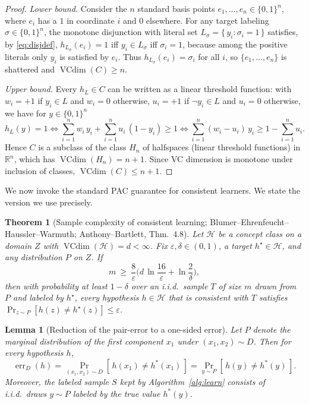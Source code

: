 \documentclass{amsart}
\newtheorem{theorem}{Theorem}
\newtheorem{lemma}{Lemma}
\theoremstyle{definition}
\theoremstyle{remark}
\newcommand{\R}{\mathbb{R}}
\newcommand{\eps}{\varepsilon}
\DeclareMathOperator{\VCdim}{VCdim}
\DeclareMathOperator*{\err}{err}
\begin{document}
\begin{proof}
\emph{Lower bound.} Consider the $n$ standard basis points $e_1,\dots,e_n\in
\{0,1\}^n$, where $e_i$ has a $1$ in coordinate $i$ and $0$ elsewhere. For any
target labeling $\sigma\in\{0,1\}^n$, the monotone disjunction with literal set
$L_\sigma=\{\,y_i:\sigma_i=1\,\}$ satisfies, by \eqref{eq:disjdef},
$h_{L_\sigma}(e_i)=1$ iff $y_i\in L_\sigma$ iff $\sigma_i=1$, because among the
positive literals only $y_i$ is satisfied by $e_i$. Thus
$h_{L_\sigma}(e_i)=\sigma_i$ for all $i$, so $\{e_1,\dots,e_n\}$ is shattered and
$\VCdim(C)\ge n$.

\emph{Upper bound.} Every $h_L\in C$ can be written as a linear threshold
function: with $w_i=+1$ if $y_i\in L$ and $w_i=0$ otherwise, $u_i=+1$ if
$\lnot y_i\in L$ and $u_i=0$ otherwise, we have for $y\in\{0,1\}^n$
\[
h_L(y)=1\iff \sum_{i=1}^n w_i\,y_i+\sum_{i=1}^n u_i\,(1-y_i)\ge 1
\iff \sum_{i=1}^n (w_i-u_i)\,y_i \ge 1-\sum_{i=1}^n u_i .
\]
Hence $C$ is a subclass of the class $H_n$ of halfspaces (linear threshold
functions) in $\R^n$, which has $\VCdim(H_n)=n+1$. Since VC dimension is
monotone under inclusion of classes, $\VCdim(C)\le n+1$.
\end{proof}

We now invoke the standard PAC guarantee for consistent learners. We state the
version we use precisely.

\begin{theorem}[Sample complexity of consistent learning; Blumer--Ehrenfeucht--Haussler--Warmuth;
Anthony--Bartlett, Thm.~4.8]
\label{thm:pac}
Let $\mathcal H$ be a concept class on a domain $Z$ with $\VCdim(\mathcal
H)=d<\infty$. Fix $\eps,\delta\in(0,1)$, a target $h^\star\in\mathcal H$, and any
distribution $P$ on $Z$. If
\[
m\ \ge\ \frac{8}{\eps}\Big(d\,\ln\frac{16}{\eps}+\ln\frac{2}{\delta}\Big),
\]
then with probability at least $1-\delta$ over an i.i.d.\ sample $T$ of size $m$
drawn from $P$ and labeled by $h^\star$, every hypothesis $h\in\mathcal H$ that
is consistent with $T$ satisfies $\Pr_{z\sim P}[h(z)\neq h^\star(z)]\le\eps$.
\end{theorem}

\begin{lemma}[Reduction of the pair-error to a one-sided error]\label{lem:reduce}
Let $P$ denote the marginal distribution of the first component $x_1$ under
$(x_1,x_2)\sim D$. Then for every hypothesis $h$,
\[
\err_D(h)=\Pr_{(x_1,x_2)\sim D}[\,h(x_1)\neq h^*(x_1)\,]
=\Pr_{y\sim P}[\,h(y)\neq h^*(y)\,].
\]
Moreover, the labeled sample $S$ kept by Algorithm~\ref{alg:learn} consists of
i.i.d.\ draws $y\sim P$ labeled by the true value $h^*(y)$.
\end{lemma}
\end{document}
